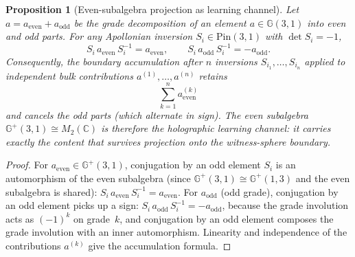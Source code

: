 \documentclass[11pt,a4paper]{article}
\theoremstyle{plain}
\newtheorem{proposition}[theorem]{Proposition}
\theoremstyle{definition}
\theoremstyle{remark}
\numberwithin{equation}{section}
\newcommand{\Cl}{\mathbb{G}}
\begin{document}
\begin{proposition}[Even-subalgebra projection as learning channel]
\label{prop:learning-channel}
Let \(a=a_{\mathrm{even}}+a_{\mathrm{odd}}\) be the grade decomposition
of an element \(a\in\Cl(3,1)\) into even and odd parts.  For any
Apollonian inversion \(S_i\in\mathrm{Pin}(3,1)\) with
\(\det S_i=-1\),
\[
  S_i\,a_{\mathrm{even}}\,S_i^{-1} = a_{\mathrm{even}},
  \qquad
  S_i\,a_{\mathrm{odd}}\,S_i^{-1} = -a_{\mathrm{odd}}.
\]
Consequently, the boundary accumulation after \(n\) inversions
\(S_{i_1},\dots,S_{i_n}\) applied to independent bulk contributions
\(a^{(1)},\dots,a^{(n)}\) retains
\[
  \sum_{k=1}^{n} a^{(k)}_{\mathrm{even}}
\]
and cancels the odd parts (which alternate in sign).  The
even subalgebra \(\Cl^+(3,1)\cong M_2(\mathbb{C})\) is
therefore the holographic learning channel: it carries exactly the
content that survives projection onto the witness-sphere boundary.
\end{proposition}

\begin{proof}
For \(a_{\mathrm{even}}\in\Cl^+(3,1)\), conjugation by an odd element
\(S_i\) is an automorphism of the even subalgebra (since
\(\Cl^+(3,1)\cong\Cl^+(1,3)\) and the even subalgebra is shared):
\(S_i\,a_{\mathrm{even}}\,S_i^{-1}=a_{\mathrm{even}}\).
For \(a_{\mathrm{odd}}\) (odd grade), conjugation by an odd element
picks up a sign: \(S_i\,a_{\mathrm{odd}}\,S_i^{-1}=-a_{\mathrm{odd}}\),
because the grade involution acts as \((-1)^k\) on grade~\(k\), and
conjugation by an odd element composes the grade involution with an
inner automorphism.  Linearity and independence of the contributions
\(a^{(k)}\) give the accumulation formula.
\end{proof}
\end{document}
